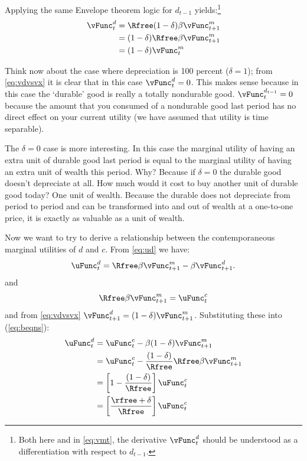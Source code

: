 \documentclass{handout}
\begin{document}
Applying the same Envelope theorem logic for $d_{t-1}$ yields:\footnote{Both here and in \eqref{eq:vmt}, the derivative $\vFunc^{d}_{t}$ should be understood as a differentiation with respect to $d_{t-1}$.}
\begin{equation}\begin{gathered}\begin{aligned}
        \vFunc_{t}^{d}  & =  \Rfree(1-\delta) \beta \vFunc^{{m}}_{t+1} \\
         & =  (1-\delta)  \Rfree \beta \vFunc_{t+1}^{{m}} \\
         & =  (1-\delta) \vFunc^{{m}}_{t} \label{eq:vdvsvx}
\end{aligned}\end{gathered}\end{equation}

Think now about the case where depreciation is 100 percent 
($\delta=1$); from \eqref{eq:vdvsvx} it is clear that in this case 
$\vFunc_{t}^{d} = 0$.  This makes sense because in this case the `durable' 
good is really a totally nondurable good.  $\vFunc^{d_{t-1}}_{t} = 0$ 
because the amount that you consumed of a nondurable good last period 
has no direct effect on your current utility (we have assumed that 
utility is time separable).

The $\delta= 0$ case is more interesting.  In this case the marginal 
utility of having an extra unit of durable good last period is equal 
to the marginal utility of having an extra unit of wealth this 
period.  Why?  Because if $\delta=0$ the durable good doesn't 
depreciate at all.  How much would it cost to buy another unit of 
durable good today?  One unit of wealth.  Because the durable does not 
depreciate from period to period and can be transformed into and out 
of wealth at a one-to-one price, it is exactly as valuable as a unit 
of wealth.

Now we want to try to derive a relationship between the contemporaneous
marginal utilities of $d$ and $c$.  From \eqref{eq:ud} we have:
\begin{equation}
\uFunc^{d}_{t} = \Rfree \beta \vFunc^{{m}}_{t+1} - \beta \vFunc^{d}_{t+1} \label{eq:beqns}.
\end{equation}
and \[ \Rfree \beta \vFunc^{{m}}_{t+1} = \uFunc^{c}_{t} \] and from 
\eqref{eq:vdvsvx} $\vFunc_{t+1}^{d} = (1-\delta) \vFunc^{{m}}_{t+1}$.  
Substituting these into (\ref{eq:beqns}):
\begin{equation}\begin{gathered}\begin{aligned}
         \uFunc_{t}^{d} & =   \uFunc_{t}^{c}-\beta(1-\delta) \vFunc_{t+1}^{{m}} \\
         & =  \uFunc_{t}^{c} - \frac{(1-\delta)}{\Rfree} \Rfree\beta \vFunc_{t+1}^{{m}}  \\
         & =  \left[1-\frac{(1-\delta)}{\Rfree}\right] \uFunc_{t}^{c} \\
         & =  \left[\frac{\rfree + \delta}{\Rfree}\right]   \uFunc_{t}^{c}\label{eq:uprimeeqn}
\end{aligned}\end{gathered}\end{equation}
\end{document}
